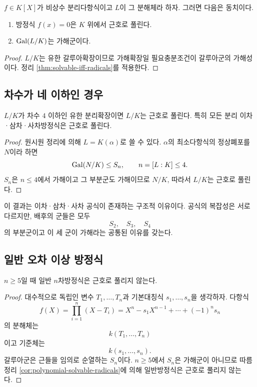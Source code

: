 \begin{corollary}[다항식의 판정]
\label{cor:polynomial-solvable-radicals}
$f\in K[X]$가 비상수 분리다항식이고 $L$이 그 분해체라 하자. 그러면 다음은 동치이다.
\begin{enumerate}[label=(\roman*)]
  \item 방정식 $f(x)=0$은 $K$ 위에서 근호로 풀린다.
  \item $\operatorname{Gal}(L/K)$는 가해군이다.
\end{enumerate}
\end{corollary}

\begin{proof}
$L/K$는 유한 갈루아확장이므로 가해확장일 필요충분조건이 갈루아군의 가해성이다. 정리 \ref{thm:solvable-iff-radicals}를 적용한다.
\end{proof}

\subsection{차수가 네 이하인 경우}

\begin{corollary}
\label{cor:degree-at-most-four-radicals}
$L/K$가 차수 $4$ 이하인 유한 분리확장이면 $L/K$는 근호로 풀린다. 특히 모든 분리 이차·삼차·사차방정식은 근호로 풀린다.
\end{corollary}

\begin{proof}
원시원 정리에 의해 $L=K(\alpha)$로 쓸 수 있다. $\alpha$의 최소다항식의 정상폐포를 $N$이라 하면
\[
  \operatorname{Gal}(N/K)\le S_n,
  \qquad n=[L:K]\le4.
\]
$S_n$은 $n\le4$에서 가해이고 그 부분군도 가해이므로 $N/K$, 따라서 $L/K$는 근호로 풀린다.
\end{proof}

이 결과는 이차·삼차·사차 공식이 존재하는 구조적 이유이다. 공식의 복잡성은 서로 다르지만, 배후의 군들은 모두
\[
  S_2,\quad S_3,\quad S_4
\]
의 부분군이고 이 세 군이 가해라는 공통된 이유를 갖는다.

\subsection{일반 오차 이상 방정식}

\begin{corollary}
\label{cor:generic-equation-not-solvable}
$n\ge5$일 때 일반 $n$차방정식은 근호로 풀리지 않는다.
\end{corollary}

\begin{proof}
대수적으로 독립인 변수 $T_1,\dots,T_n$과 기본대칭식 $s_1,\dots,s_n$을 생각하자. 다항식
\[
  f(X)=\prod_{i=1}^n(X-T_i)
  =X^n-s_1X^{n-1}+\cdots+(-1)^ns_n
\]
의 분해체는
\[
  k(T_1,\dots,T_n)
\]
이고 기준체는
\[
  k(s_1,\dots,s_n).
\]
갈루아군은 근들을 임의로 순열하는 $S_n$이다. $n\ge5$에서 $S_n$은 가해군이 아니므로 따름정리 \ref{cor:polynomial-solvable-radicals}에 의해 일반방정식은 근호로 풀리지 않는다.
\end{proof}

